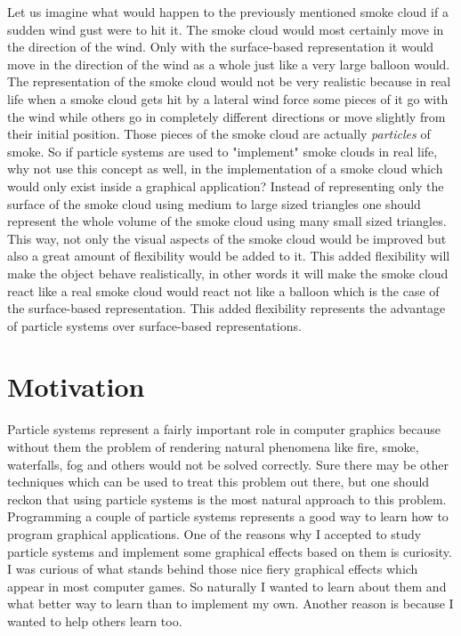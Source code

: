 Let us imagine what would happen to the previously mentioned smoke cloud if a sudden wind gust were to hit it. The smoke cloud would most certainly move in the direction of the wind. Only with the surface-based representation it would move in the direction of the wind as a whole just like a very large balloon would. The representation of the smoke cloud would not be very realistic because in real life when a smoke cloud gets hit by a lateral wind force some pieces of it go with the wind while others go in completely different directions or move slightly from their initial position. Those pieces of the smoke cloud are actually \textit{particles} of smoke. So if particle systems are used to "implement" smoke clouds in real life, why not use this concept as well, in the implementation of a smoke cloud which would only exist inside a graphical application? Instead of representing only the surface of the smoke cloud using medium to large sized triangles one should represent the whole volume of the smoke cloud using many small sized triangles. This way, not only the visual aspects of the smoke cloud would be improved but also a great amount of flexibility would be added to it. This added flexibility will make the object behave realistically, in other words it will make the smoke cloud react like a real smoke cloud would react not like a balloon which is the case of the surface-based representation. This added flexibility represents the advantage of particle systems over surface-based representations.\\
\newpage
\section{Motivation}
Particle systems represent a fairly important role in computer graphics because without them the problem of rendering natural phenomena like fire, smoke, waterfalls, fog and others would not be solved correctly. Sure there may be other techniques which can be used to treat this problem out there, but one should reckon that using particle systems is the most natural approach to this problem.\\

Programming a couple of particle systems represents a good way to learn how to program graphical applications. One of the reasons why I accepted to study particle systems and implement some graphical effects based on them is curiosity. I was curious of what stands behind those nice fiery graphical effects which appear in most computer games. So naturally I wanted to learn about them and what better way to learn than to implement my own. Another reason is because I wanted to help others learn too.\\

